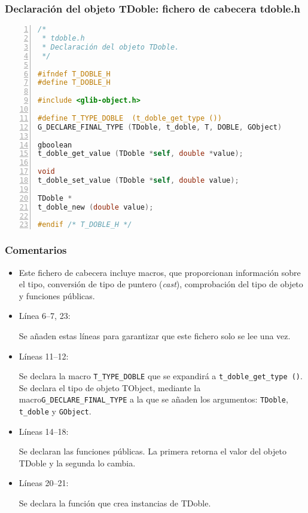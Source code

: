 \subsubsection{Declaración del objeto \textsf{TDoble}: fichero de cabecera \textsf{tdoble.h}}

\begin{lstlisting}[language=C, numbers=left]
/*
 * tdoble.h
 * Declaración del objeto TDoble.
 */

#ifndef T_DOBLE_H
#define T_DOBLE_H
 
#include <glib-object.h>
 
#define T_TYPE_DOBLE  (t_doble_get_type ())
G_DECLARE_FINAL_TYPE (TDoble, t_doble, T, DOBLE, GObject)
 
gboolean
t_doble_get_value (TDoble *self, double *value);
 
void
t_doble_set_value (TDoble *self, double value);
 
TDoble *
t_doble_new (double value);

#endif /* T_DOBLE_H */
\end{lstlisting}

\subsubsection{Comentarios}
\begin{itemize}
\item Este fichero de cabecera incluye macros, que proporcionan información sobre el tipo, conversión de
  tipo de puntero (\textit{cast}), comprobación del tipo de objeto y funciones públicas.
\item Línea 6--7, 23:\par
  Se añaden estas líneas para garantizar que este fichero solo se lee una vez.
\item Líneas 11--12:\par
  Se declara la macro \texttt{T\_TYPE\_DOBLE} que se expandirá a \texttt{t\_doble\_get\_type ()}.
  Se declara el tipo de objeto \textsf{TObject}, mediante la macro\texttt{G\_DECLARE\_FINAL\_TYPE}
  a la que se añaden los argumentos: \texttt{TDoble}, \texttt{t\_doble} y \texttt{GObject}.
\item Líneas 14--18:\par
  Se declaran las funciones públicas. La primera retorna el valor del objeto \textsf{TDoble} y la
  segunda lo cambia.
\item Líneas 20--21:\par
  Se declara la función que crea instancias de \textsf{TDoble}.
\end{itemize}

